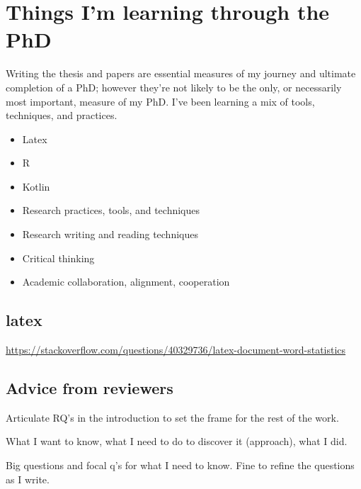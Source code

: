\chapter{Things I'm learning through the PhD}
Writing the thesis and papers are essential measures of my journey and ultimate completion of a PhD; however they're not likely to be the only, or necessarily most important, measure of my PhD. I've been learning a mix of tools, techniques, and practices.

\begin{itemize}
    \item Latex
    \item R
    \item Kotlin
    \item Research practices, tools, and techniques
    \item Research writing and reading techniques
    \item Critical thinking
    \item Academic collaboration, alignment, cooperation
\end{itemize}{}

\section{latex}
\url{https://stackoverflow.com/questions/40329736/latex-document-word-statistics}

\section{Advice from reviewers}


Articulate RQ's in the introduction to set the frame for the rest of the work.

What I want to know, what I need to do to discover it (approach), what I did.

Big questions and focal q's for what I need to know. Fine to refine the questions as I write.

\clearpage
